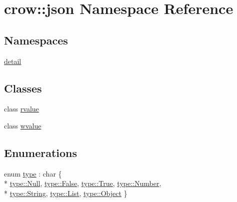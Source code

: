 \hypertarget{namespacecrow_1_1json}{\section{crow\-:\-:json Namespace Reference}
\label{namespacecrow_1_1json}
}
\subsection*{Namespaces}
\begin{DoxyCompactItemize}
\item 
\hyperlink{namespacecrow_1_1json_1_1detail}{detail}
\end{DoxyCompactItemize}
\subsection*{Classes}
\begin{DoxyCompactItemize}
\item 
class \hyperlink{classcrow_1_1json_1_1rvalue}{rvalue}
\item 
class \hyperlink{classcrow_1_1json_1_1wvalue}{wvalue}
\end{DoxyCompactItemize}
\subsection*{Enumerations}
\begin{DoxyCompactItemize}
\item 
enum \hyperlink{namespacecrow_1_1json_adb9569a402d1b289a75025c8c96e5d99}{type} \-: char \{ \\*
\hyperlink{namespacecrow_1_1json_adb9569a402d1b289a75025c8c96e5d99abbb93ef26e3c101ff11cdd21cab08a94}{type\-::\-Null}, 
\hyperlink{namespacecrow_1_1json_adb9569a402d1b289a75025c8c96e5d99af8320b26d30ab433c5a54546d21f414c}{type\-::\-False}, 
\hyperlink{namespacecrow_1_1json_adb9569a402d1b289a75025c8c96e5d99af827cf462f62848df37c5e1e94a4da74}{type\-::\-True}, 
\hyperlink{namespacecrow_1_1json_adb9569a402d1b289a75025c8c96e5d99ab2ee912b91d69b435159c7c3f6df7f5f}{type\-::\-Number}, 
\\*
\hyperlink{namespacecrow_1_1json_adb9569a402d1b289a75025c8c96e5d99a27118326006d3829667a400ad23d5d98}{type\-::\-String}, 
\hyperlink{namespacecrow_1_1json_adb9569a402d1b289a75025c8c96e5d99a4ee29ca12c7d126654bd0e5275de6135}{type\-::\-List}, 
\hyperlink{namespacecrow_1_1json_adb9569a402d1b289a75025c8c96e5d99a497031794414a552435f90151ac3b54b}{type\-::\-Object}
 \}
\end{DoxyCompactItemize}
